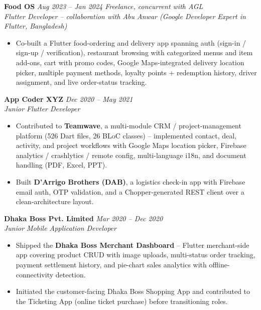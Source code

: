 \documentclass[a4paper,10pt]{article}
\begin{document}
\vspace{1.5mm}
\noindent\textbf{Food OS} \hfill \textit{Aug 2023 -- Jan 2024 \textbar{} Freelance, concurrent with AGL}\\
\textit{Flutter Developer -- collaboration with Abu Anwar (Google Developer Expert in Flutter, Bangladesh)}
\begin{itemize}[leftmargin=*, noitemsep, topsep=2pt, parsep=0pt, partopsep=0pt]
    \item Co-built a Flutter food-ordering and delivery app spanning auth (sign-in / sign-up / verification), restaurant browsing with categorized menus and item add-ons, cart with promo codes, Google Maps-integrated delivery location picker, multiple payment methods, loyalty points + redemption history, driver assignment, and live order-status tracking.
\end{itemize}

\vspace{1.5mm}
\noindent\textbf{App Coder XYZ} \hfill \textit{Dec 2020 -- May 2021}\\
\textit{Junior Flutter Developer}
\begin{itemize}[leftmargin=*, noitemsep, topsep=2pt, parsep=0pt, partopsep=0pt]
    \item Contributed to \textbf{Teamwave}, a multi-module CRM / project-management platform (526 Dart files, 26 BLoC classes) -- implemented contact, deal, activity, and project workflows with Google Maps location picker, Firebase analytics / crashlytics / remote config, multi-language i18n, and document handling (PDF, Excel, PPT).
    \item Built \textbf{D'Arrigo Brothers (DAB)}, a logistics check-in app with Firebase email auth, OTP validation, and a Chopper-generated REST client over a clean-architecture layout.
\end{itemize}

\vspace{1.5mm}
\noindent\textbf{Dhaka Boss Pvt. Limited} \hfill \textit{Mar 2020 -- Dec 2020}\\
\textit{Junior Mobile Application Developer}
\begin{itemize}[leftmargin=*, noitemsep, topsep=2pt, parsep=0pt, partopsep=0pt]
    \item Shipped the \textbf{Dhaka Boss Merchant Dashboard} -- Flutter merchant-side app covering product CRUD with image uploads, multi-status order tracking, payment settlement history, and pie-chart sales analytics with offline-connectivity detection.
    \item Initiated the customer-facing Dhaka Boss Shopping App and contributed to the Ticketing App (online ticket purchase) before transitioning roles.
\end{itemize}
\end{document}
